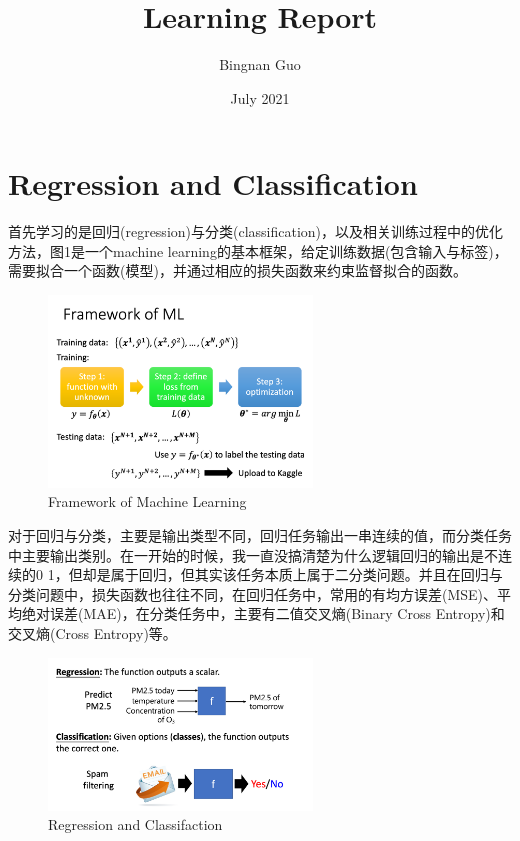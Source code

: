 \documentclass{article}
\title{Learning Report}
\author{Bingnan Guo}
\date{July 2021}
\begin{document}
\maketitle

\tableofcontents
\newpage

\section{Regression and Classification}
\indent 首先学习的是回归(regression)与分类(classification)，以及相关训练过程中的优化方法，图1是一个machine learning的基本框架，给定训练数据(包含输入与标签)，需要拟合一个函数(模型)，并通过相应的损失函数来约束监督拟合的函数。\par
\begin{figure}[H]
    \centering
    \includegraphics[width=7cm]{picture/FoM.png}
    \caption{Framework of Machine Learning}
    \label{fig:galaxy}
\end{figure}
\indent 对于回归与分类，主要是输出类型不同，回归任务输出一串连续的值，而分类任务中主要输出类别。在一开始的时候，我一直没搞清楚为什么逻辑回归的输出是不连续的0 1，但却是属于回归，但其实该任务本质上属于二分类问题。并且在回归与分类问题中，损失函数也往往不同，在回归任务中，常用的有均方误差(MSE)、平均绝对误差(MAE)，在分类任务中，主要有二值交叉熵(Binary Cross Entropy)和交叉熵(Cross Entropy)等。
\begin{figure}[H]
    \centering
    \includegraphics[width=7cm]{picture/RnC1.png}
    \caption{Regression and Classifaction}
    \label{fig:galaxy}
\end{figure}
\end{document}
